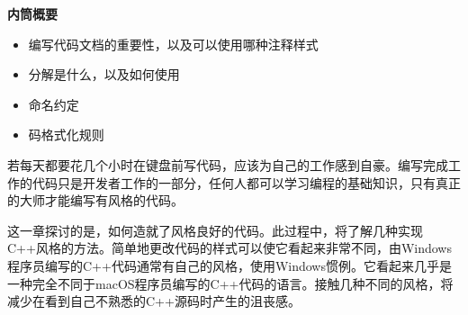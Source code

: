 \noindent
\textbf{内筒概要}

\begin{itemize}
\item
编写代码文档的重要性，以及可以使用哪种注释样式

\item
分解是什么，以及如何使用

\item
命名约定

\item
码格式化规则
\end{itemize}

若每天都要花几个小时在键盘前写代码，应该为自己的工作感到自豪。编写完成工作的代码只是开发者工作的一部分，任何人都可以学习编程的基础知识，只有真正的大师才能编写有风格的代码。

这一章探讨的是，如何造就了风格良好的代码。此过程中，将了解几种实现C++风格的方法。简单地更改代码的样式可以使它看起来非常不同，由Windows程序员编写的C++代码通常有自己的风格，使用Windows惯例。它看起来几乎是一种完全不同于macOS程序员编写的C++代码的语言。接触几种不同的风格，将减少在看到自己不熟悉的C++源码时产生的沮丧感。
